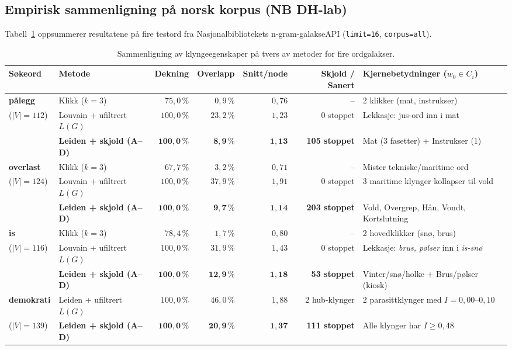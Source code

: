 \documentclass[11pt,a4paper]{article}
\begin{document}
\subsection{Empirisk sammenligning på norsk korpus (NB DH-lab)}
Tabell~\ref{tab:comparison} oppsummerer resultatene på fire testord fra Nasjonalbibliotekets n-gram-galakseAPI (\texttt{limit=16}, \texttt{corpus=all}).

\begin{table}[htbp]
\centering
\caption{Sammenligning av klyngeegenskaper på tvers av metoder for fire ordgalakser.}
\label{tab:comparison}
\small
\begin{tabular}{@{}llrrrrl@{}}
\toprule
\textbf{Søkeord} & \textbf{Metode} & \textbf{Dekning} & \textbf{Overlapp} & \textbf{Snitt/node} & \textbf{Skjold / Sanert} & \textbf{Kjernebetydninger ($w_0 \in C_i$)} \\
\midrule
\textbf{pålegg} & Klikk ($k=3$) & $75{,}0\,\%$ & $0{,}9\,\%$ & $0{,}76$ & -- & 2 klikker (mat, instrukser) \\
($|V|=112$) & Louvain + ufiltrert $L(G)$ & $100{,}0\,\%$ & $23{,}2\,\%$ & $1{,}23$ & 0 stoppet & Lekkasje: jus-ord inn i mat \\
 & \textbf{Leiden + skjold (A--D)} & $\mathbf{100{,}0\,\%}$ & $\mathbf{8{,}9\,\%}$ & $\mathbf{1{,}13}$ & \textbf{105 stoppet} & Mat (3 fasetter) + Instrukser (1) \\
\midrule
\textbf{overlast} & Klikk ($k=3$) & $67{,}7\,\%$ & $3{,}2\,\%$ & $0{,}71$ & -- & Mister tekniske/maritime ord \\
($|V|=124$) & Louvain + ufiltrert $L(G)$ & $100{,}0\,\%$ & $37{,}9\,\%$ & $1{,}91$ & 0 stoppet & 3 maritime klynger kollapser til vold \\
 & \textbf{Leiden + skjold (A--D)} & $\mathbf{100{,}0\,\%}$ & $\mathbf{9{,}7\,\%}$ & $\mathbf{1{,}14}$ & \textbf{203 stoppet} & Vold, Overgrep, Hån, Vondt, Kortslutning \\
\midrule
\textbf{is} & Klikk ($k=3$) & $78{,}4\,\%$ & $1{,}7\,\%$ & $0{,}80$ & -- & 2 hovedklikker (snø, brus) \\
($|V|=116$) & Louvain + ufiltrert $L(G)$ & $100{,}0\,\%$ & $31{,}9\,\%$ & $1{,}43$ & 0 stoppet & Lekkasje: \emph{brus, pølser} inn i \emph{is-snø} \\
 & \textbf{Leiden + skjold (A--D)} & $\mathbf{100{,}0\,\%}$ & $\mathbf{12{,}9\,\%}$ & $\mathbf{1{,}18}$ & \textbf{53 stoppet} & Vinter/snø/holke + Brus/pølser (kiosk) \\
\midrule
\textbf{demokrati} & Leiden + ufiltrert $L(G)$ & $100{,}0\,\%$ & $46{,}0\,\%$ & $1{,}88$ & 2 hub-klynger & 2 parasittklynger med $I = 0{,}00\text{--}0{,}10$ \\
($|V|=139$) & \textbf{Leiden + skjold (A--D)} & $\mathbf{100{,}0\,\%}$ & $\mathbf{20{,}9\,\%}$ & $\mathbf{1{,}37}$ & \textbf{111 stoppet} & Alle klynger har $I \ge 0{,}48$ \\
\bottomrule
\end{tabular}
\end{table}
\end{document}
